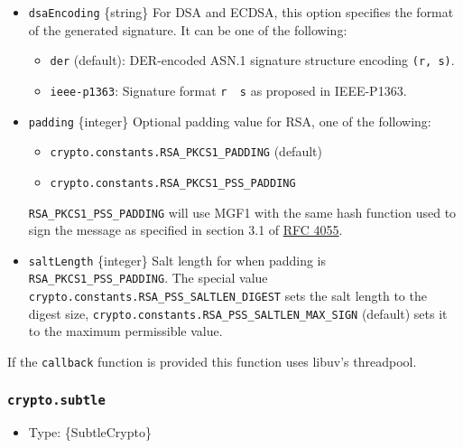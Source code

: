\begin{itemize}
\item
  \texttt{dsaEncoding} \{string\} For DSA and ECDSA, this option
  specifies the format of the generated signature. It can be one of the
  following:

  \begin{itemize}
  \tightlist
  \item
    \texttt{\textquotesingle{}der\textquotesingle{}} (default):
    DER-encoded ASN.1 signature structure encoding \texttt{(r,\ s)}.
  \item
    \texttt{\textquotesingle{}ieee-p1363\textquotesingle{}}: Signature
    format \texttt{r\ \textbar{}\textbar{}\ s} as proposed in
    IEEE-P1363.
  \end{itemize}
\item
  \texttt{padding} \{integer\} Optional padding value for RSA, one of
  the following:

  \begin{itemize}
  \tightlist
  \item
    \texttt{crypto.constants.RSA\_PKCS1\_PADDING} (default)
  \item
    \texttt{crypto.constants.RSA\_PKCS1\_PSS\_PADDING}
  \end{itemize}

  \texttt{RSA\_PKCS1\_PSS\_PADDING} will use MGF1 with the same hash
  function used to sign the message as specified in section 3.1 of
  \href{https://www.rfc-editor.org/rfc/rfc4055.txt}{RFC 4055}.
\item
  \texttt{saltLength} \{integer\} Salt length for when padding is
  \texttt{RSA\_PKCS1\_PSS\_PADDING}. The special value
  \texttt{crypto.constants.RSA\_PSS\_SALTLEN\_DIGEST} sets the salt
  length to the digest size,
  \texttt{crypto.constants.RSA\_PSS\_SALTLEN\_MAX\_SIGN} (default) sets
  it to the maximum permissible value.
\end{itemize}

If the \texttt{callback} function is provided this function uses libuv's
threadpool.

\subsubsection{\texorpdfstring{\texttt{crypto.subtle}}{crypto.subtle}}\label{crypto.subtle}

\begin{itemize}
\tightlist
\item
  Type: \{SubtleCrypto\}
\end{itemize}

